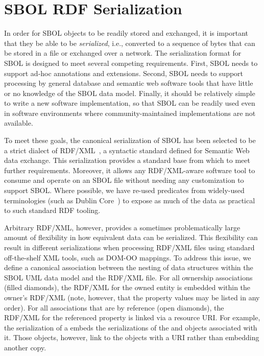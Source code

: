 \section{SBOL RDF Serialization}
\label{sec:serialization}

In order for SBOL objects to be readily stored and exchanged, it is important that they be able to be {\em serialized}, i.e., converted to a sequence of bytes that can be stored in a file or exchanged over a network.  The serialization format for SBOL is designed to meet several competing requirements. 
First, SBOL needs to support ad-hoc annotations and extensions. 
Second, SBOL needs to support processing by general database and semantic web software tools that have little or no knowledge of the SBOL data model. 
Finally, it should be relatively simple to write a new software implementation, so that SBOL can be readily used even in software environments where community-maintained implementations are not available.

To meet these goals, the canonical serialization of SBOL has been selected to be a strict dialect of RDF/XML~\cite{rdfxml}, a syntactic standard defined for Semantic Web data exchange. 
This serialization provides a standard base from which to meet further requirements. 
Moreover, it allows any RDF/XML-aware software tool to consume and operate on an SBOL file without needing any customization to support SBOL. Where possible, we have re-used predicates from widely-used terminologies (such as Dublin Core~\cite{dcmi2012}) to expose as much of the data as practical to such standard RDF tooling.

Arbitrary RDF/XML, however, provides a sometimes problematically large amount of flexibility in how equivalent data can be serialized. This flexibility can result in different serializations when processing RDF/XML files using standard off-the-shelf XML tools, such as DOM-OO mappings. 
To address this issue, we define a canonical association between the nesting of data structures within the SBOL UML data model and the RDF/XML file. For all ownership associations (filled diamonds), the RDF/XML for the owned entity is embedded within the owner's RDF/XML (note, however, that the property values may be listed in any order).
For all associations that are by reference (open diamonds), the RDF/XML for the referenced property is linked via a resource URI.
For example, the serialization of a  embeds the serializations of the  and  objects associated with it.  Those  objects, however, link to the  objects with a URI rather than embedding another copy.


